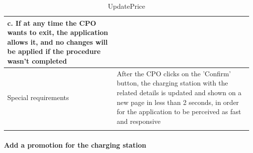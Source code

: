 \begin{center}
\begin{longtable}{p{4cm} p{11cm}}
                    c. If at any time the CPO wants to exit, the application allows it, and no changes will be applied if the procedure wasn't completed \\
     \hline
     Special requirements & After the CPO clicks on the 'Confirm' button, the charging station with the related details is updated and shown on a new page in less than 2 seconds, in order for the application to be perceived as fast and responsive\\
     \hline
    \caption{UpdatePrice}
    \label{tab:UpdatePrice}
    \end{longtable}
\end{center}


\paragraph{Add a promotion for the charging station}
